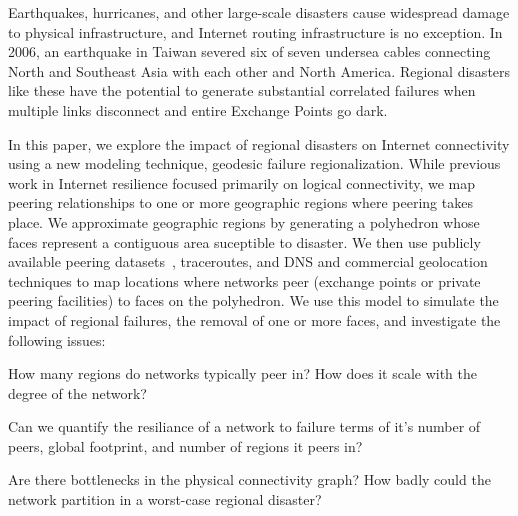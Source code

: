 

Earthquakes, hurricanes, and other large-scale disasters cause widespread damage
to physical infrastructure, and Internet routing infrastructure is no exception.
In 2006, an earthquake in Taiwan severed six of seven 
undersea cables connecting North and Southeast Asia with each other and North 
America. 
Regional disasters like these have the potential to generate substantial 
correlated failures when multiple links disconnect and entire Exchange Points
go dark.


In this paper, we explore the impact of regional disasters on Internet
connectivity using a new modeling technique, geodesic failure regionalization.
While previous work in Internet resilience focused primarily on logical
connectivity, we map peering relationships to one or more geographic regions
where peering takes place.  We approximate geographic regions by generating a
polyhedron whose faces represent a contiguous area suceptible to disaster.  We
then use publicly available peering datasets~\cite{ixps-mapped, peeringdb},
traceroutes, and DNS and commercial geolocation techniques to map locations
where networks peer (exchange points or private peering facilities) to faces on
the polyhedron.  We use this model to simulate the impact of regional failures,
\ie{} the removal of one or more faces, and investigate the following issues:

 How many regions do networks
typically peer in? How does it scale with the degree of the network?

 Can we quantify the resiliance of a
network to failure terms of it's number of peers, global footprint, and number
of regions it peers in?

 Are there bottlenecks in the
physical connectivity graph? How badly could the network partition in a
worst-case regional disaster?

